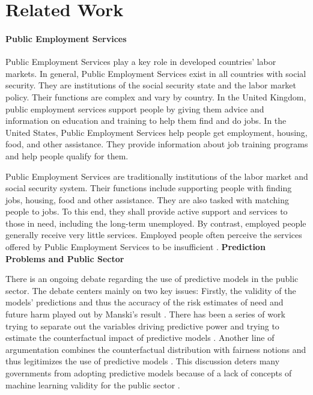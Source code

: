 \documentclass{article} %
\begin{document}
\section{Related Work}

\label{sec:relatedwork}
\paragraph{Public Employment Services}
Public Employment Services play a key role in developed countries' labor markets. In general, Public Employment Services exist in all countries with social security. They are institutions of the social security state and the labor market policy. Their functions are complex and vary by country. In the United Kingdom, public employment services support people by giving them advice and information on education and training to help them find and do jobs. In the United States, Public Employment Services help people get employment, housing, food, and other assistance. They provide information about job training programs and help people qualify for them.

Public Employment Services are traditionally institutions of the labor market and social security system. Their functions include supporting people with finding jobs, housing, food and other assistance. They are also tasked with matching people to jobs. To this end, they shall provide active support and services to those in need, including the long-term unemployed. By contrast, employed people generally receive very little services. Employed people often perceive the services offered by Public Employment Services to be insufficient \cite{kortner2023predictive}. 
\textbf{Prediction Problems and Public Sector}

There is an ongoing debate regarding the use of predictive models in the public sector. The debate centers mainly on two key issues: Firstly, the validity of the models' predictions and thus the accuracy of the risk estimates of need and future harm played out by Manski's result \cite{Manski2004}. There has been a series of work trying to separate out the variables driving predictive power and trying to estimate the counterfactual impact of predictive models \cite{Bach_Kern_Mautner_Kreuter_2023, chouldechova2018case, elmachtoub2022smart, jain2024position, shirali2024}. Another line of argumentation combines the counterfactual distribution with fairness notions and thus legitimizes the use of predictive models \cite{coston2023sat,Guerdan23,wang2024}. This discussion deters many governments from adopting predictive models because of a lack of concepts of machine learning validity for the public sector \cite{Bach_Kern_Mautner_Kreuter_2023}.
\end{document}
